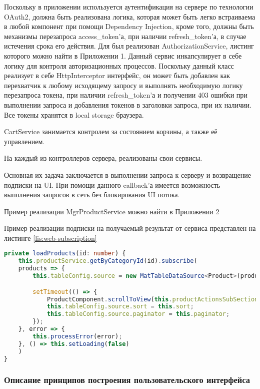 Поскольку в приложении используется аутентификация на сервере по технологии OAuth2, должна быть реализована логика, которая может быть легко встраиваема в любой компонент при помощи Dependency Injection, кроме того, должны быть механизмы перезапроса access\_token’а, при наличии refresh\_token’а, в случае истечения срока его действия.
Для был реализован AuthorizationService, листинг которого можно найти в Приложении 1.
Данный сервис инкапсулирует в себе логику для контроля авторизационных процессов.
Поскольку данный класс реализует в себе HttpInterceptor интерфейс, он может быть добавлен как перехватчик к любому исходящему запросу и выполнять необходимую логику перезапроса токена, при наличии refresh\_token’а и получении 403 ошибки при выполнении запроса и добавления токенов в заголовки запроса, при их наличии.
Все токены хранятся в local storage браузера.

CartService занимается контролем за состоянием корзины, а также её управлением.

На каждый из контроллеров сервера, реализованы свои сервисы.

Основная их задача заключается в выполнении запроса к серверу и возвращение подписки на UI.
При помощи данного callback’а имеется возможность выполнения запросов в сеть без блокирования UI потока.

Пример реализации MgrProductService можно найти в Приложении 2

Пример реализации подписки на получаемый результат от сервиса представлен на листинге \ref{lis:web-subscription}

\begin{lstlisting}[language=TypeScript, captionpos=b,
label={lis:web-subscription},
caption={Пример реализации подписки на ожидаемый результат от сервера}
]
private loadProducts(id: number) {
    this.productService.getByCategoryId(id).subscribe(
    products => {
        this.tableConfig.source = new MatTableDataSource<Product>(products);

        setTimeout(() => {
            ProductComponent.scrollToView(this.productActionsSubSection);
            this.tableConfig.source.sort = this.sort;
            this.tableConfig.source.paginator = this.paginator;
        });
    }, error => {
        this.processError(error);
    }, () => this.setLoading(false)
    )
}
\end{lstlisting}

\subsubsection{Описание принципов построения пользовательского интерфейса}\indent

